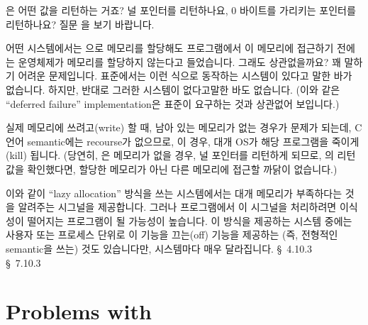 \begin{faq}
        은 어떤 값을 리턴하는 거죠? 널 포인터를 리턴하나요,
        0 바이트를 가리키는 포인터를 리턴하나요?
\A
        질문 을 보기 바랍니다.
\end{faq}

\begin{faq}
	어떤 시스템에서는 으로 메모리를 할당해도
	프로그램에서 이 메모리에 접근하기 전에는 운영체제가 메모리를
	할당하지 않는다고 들었습니다.  그래도 상관없을까요?
\A
	꽤 말하기 어려운 문제입니다.  표준에서는 이런 식으로 동작하는
	시스템이 있다고 말한 바가 없습니다.  하지만, 반대로 그러한 시스템이 
        없다고말한 바도 없습니다. (이와 같은 ``deferred failure''
        implementation은 표준이 요구하는 것과 상관없어 보입니다.)

        실제 메모리에 쓰려고(write) 할 때, 남아 있는 메모리가 없는 경우가
        문제가 되는데, C 언어 semantic에는 recourse가 없으므로,
        이 경우, 대개 OS가 해당 프로그램을 죽이게(kill) 됩니다.
        (당연히, 은 메모리가 없을 경우, 널 포인터를 리턴하게 되므로,
        의 리턴 값을 확인했다면, 할당한 메모리가 아닌 다른 메모리에
        접근할 까닭이 없습니다.)
        
        이와 같이 ``lazy allocation'' 방식을 쓰는 시스템에서는 대개 메모리가
        부족하다는 것을 알려주는 시그널을 제공합니다. 그러나 프로그램에서
        이 시그널을 처리하려면 이식성이 떨어지는 프로그램이 될 가능성이
        높습니다.  이 방식을 제공하는 시스템 중에는 사용자 또는 프로세스 단위로
        이 기능을 끄는(off) 기능을
        제공하는 (즉, 전형적인  semantic을 쓰는) 것도 있습니다만,
        시스템마다 매우 달라집니다.
\R
	\cite{ansi} \S\ 4.10.3 \\
	\cite{c89} \S\ 7.10.3
\end{faq}

\section{Problems with }

